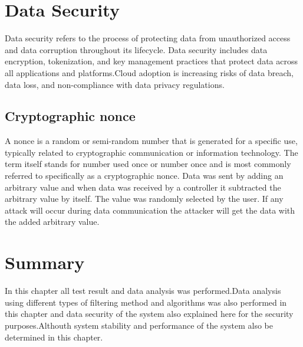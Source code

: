 \section{Data Security }
Data security refers to the process of protecting data from unauthorized access and data corruption throughout its lifecycle. Data security includes data encryption, tokenization, and key management practices that protect data across all applications and platforms.Cloud adoption is increasing risks of data breach, data loss, and non-compliance with data privacy regulations.
\subsection{Cryptographic nonce}
A nonce is a random or semi-random number that is generated for a specific use, typically related to cryptographic communication or information technology. The term itself stands for number used once  or number once  and is most commonly referred to specifically as a cryptographic nonce. Data was sent by adding an arbitrary value and when data was received by a controller it subtracted the arbitrary value by itself. The value was randomly selected by the user. If any attack will occur during data communication the attacker will get the data with the added arbitrary value.
\section{Summary}
In this chapter all test result and data analysis was performed.Data analysis using different types of filtering method and algorithms was also performed in this chapter and data security of the system also explained here for the security purposes.Althouth system stability and performance of the system also be determined in this chapter.

